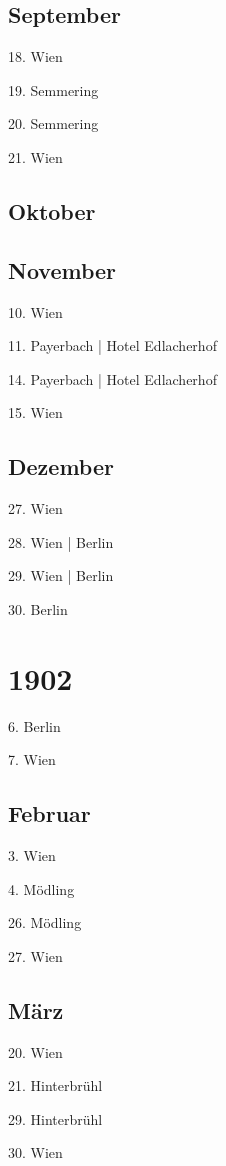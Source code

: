 \documentclass[twoside=false,titlepage=false,open=any, parskip=never, fontsize=10pt, headings=small, chapterprefix=false, appendixprefix=false, DIV=15]{scrbook}
\begin{document}
\begin{multicols}{3}
            \section*{September}
            18. Wien\par
            19. Semmering\par
            20. Semmering\par
            21. Wien\par
            \section*{Oktober}
            \section*{November}
            10. Wien\par
            11. Payerbach | Hotel Edlacherhof\par
            14. Payerbach | Hotel Edlacherhof\par
            15. Wien\par
            \section*{Dezember}
            27. Wien\par
            28. Wien | Berlin\par
            29. Wien | Berlin\par
            30. Berlin\par
            \chapter*{1902}
            6. Berlin\par
            7. Wien\par
            \section*{Februar}
            3. Wien\par
            4. Mödling\par
            26. Mödling\par
            27. Wien\par
            \section*{März}
            20. Wien\par
            21. Hinterbrühl\par
            29. Hinterbrühl\par
            30. Wien\par

\end{multicols}
\end{document}
